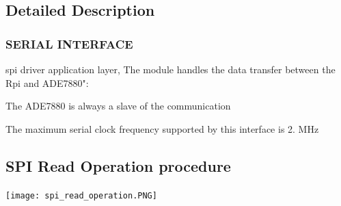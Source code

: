 \subsection{Detailed Description}






 \hypertarget{file2}{}\subsubsection{S\-E\-R\-I\-A\-L I\-N\-T\-E\-R\-F\-A\-C\-E}\label{file2}
spi driver application layer, The module handles the data transfer between the Rpi and A\-D\-E7880"\-:

\begin{DoxyItemize}
\item The A\-D\-E7880 is always a slave of the communication\end{DoxyItemize}
\begin{DoxyItemize}
\item The maximum serial clock frequency supported by this interface is 2. M\-Hz \par
\par
\par
\end{DoxyItemize}
\hypertarget{de/d21/a00006_READ}{}\subsection{S\-P\-I Read Operation procedure}\label{de/d21/a00006_READ}
 
\begin{DoxyImageNoCaption}
  \mbox{\texttt{[image: spi\_read\_operation.PNG]}}
\end{DoxyImageNoCaption}


